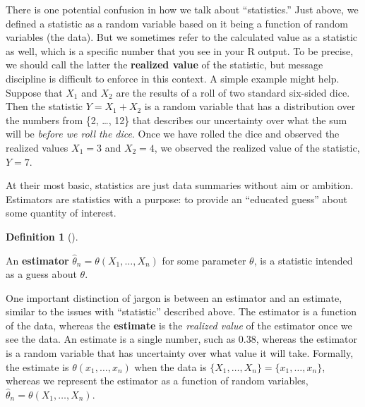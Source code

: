 \documentclass[
  letterpaper,
  DIV=11,
  numbers=noendperiod]{scrreprt}
\theoremstyle{definition}
\newtheorem{definition}{Definition}[chapter]
\theoremstyle{plain}
\theoremstyle{definition}
\theoremstyle{remark}
\begin{document}
\begin{tcolorbox}[enhanced jigsaw, title=\textcolor{quarto-callout-warning-color}{\faExclamationTriangle}\hspace{0.5em}{Warning}, breakable, titlerule=0mm, opacityback=0, rightrule=.15mm, bottomrule=.15mm, colframe=quarto-callout-warning-color-frame, coltitle=black, colbacktitle=quarto-callout-warning-color!10!white, bottomtitle=1mm, toptitle=1mm, colback=white, arc=.35mm, opacitybacktitle=0.6, toprule=.15mm, leftrule=.75mm, left=2mm]

There is one potential confusion in how we talk about ``statistics.''
Just above, we defined a statistic as a random variable based on it
being a function of random variables (the data). But we sometimes refer
to the calculated value as a statistic as well, which is a specific
number that you see in your R output. To be precise, we should call the
latter the \textbf{realized value} of the statistic, but message
discipline is difficult to enforce in this context. A simple example
might help. Suppose that \(X_1\) and \(X_2\) are the results of a roll
of two standard six-sided dice. Then the statistic \(Y = X_1 + X_2\) is
a random variable that has a distribution over the numbers from \{2,
\ldots, 12\} that describes our uncertainty over what the sum will be
\emph{before we roll the dice}. Once we have rolled the dice and
observed the realized values \(X_1 = 3\) and \(X_2 = 4\), we observed
the realized value of the statistic, \(Y = 7\).

\end{tcolorbox}

At their most basic, statistics are just data summaries without aim or
ambition. Estimators are statistics with a purpose: to provide an
``educated guess'' about some quantity of interest.

\leavevmode{}%
\begin{definition}[]\label{def-estimator}

An \textbf{estimator} \(\widehat{\theta}_n = \theta(X_1, \ldots, X_n)\)
for some parameter \(\theta\), is a statistic intended as a guess about
\(\theta\).

\end{definition}

One important distinction of jargon is between an estimator and an
estimate, similar to the issues with ``statistic'' described above. The
estimator is a function of the data, whereas the \textbf{estimate} is
the \emph{realized value} of the estimator once we see the data. An
estimate is a single number, such as 0.38, whereas the estimator is a
random variable that has uncertainty over what value it will take.
Formally, the estimate is \(\theta(x_1, \ldots, x_n)\) when the data is
\(\{X_1, \ldots, X_n\} = \{x_1, \ldots, x_n\}\), whereas we represent
the estimator as a function of random variables,
\(\widehat{\theta}_n = \theta(X_1, \ldots, X_n)\).
\end{document}
